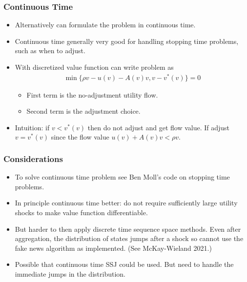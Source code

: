 \documentclass[english,xcolor=svgnames]{beamer}
\begin{document}
\begin{frame}
    \frametitle{Continuous Time}
    \begin{itemize}
        \item Alternatively can formulate the problem in continuous time.
        \item Continuous time generally very good for handling stopping time problems, such as when to adjust.
        \item With discretized value function can write problem as
        \begin{align*}
            \min\{\rho v - u(v) - A(v)v, v - v^{*}(v)\} = 0
        \end{align*}
        \begin{itemize}
            \item First term is the no-adjustment utility flow.
            \item Second term is the adjustment choice.
        \end{itemize}
        \item Intuition: if $v < v^{*}(v)$ then do not adjust and get flow value. If adjust $v = v^{*}(v)$ since the flow value $u(v) + A(v)v < \rho v$.
    \end{itemize}
\end{frame}

\begin{frame}
    \frametitle{Considerations}
    \begin{itemize}
        \item To solve continuous time problem see Ben Moll's code on stopping time problems.
        \item In principle continuous time better: do not require sufficiently large utility shocks to make value function differentiable.
        \item But harder to then apply discrete time sequence space methods. Even after aggregation, the distribution of states jumps after a shock so cannot use the fake news algorithm as implemented. (See McKay-Wieland 2021.)
        \item Possible that continuous time SSJ could be used. But need to handle the immediate jumps in the distribution.
    \end{itemize}
\end{frame}
\end{document}
